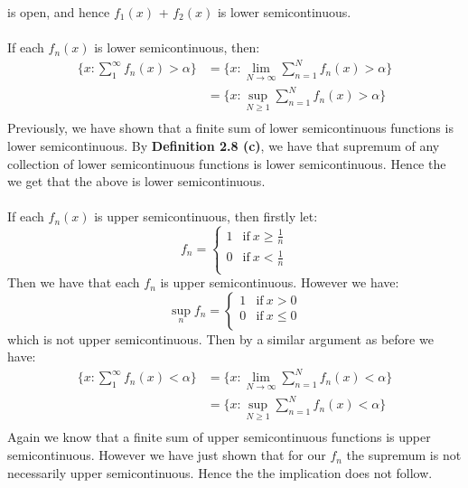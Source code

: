 \documentclass{article}
\begin{document}
is open, and hence $f_1(x)$ + $f_2(x)$ is lower semicontinuous.
\\\\
If each $f_n(x)$ is lower semicontinuous, then:
\begin{equation*}
    \begin{aligned}
        \{ x: \sum_1^\infty f_n(x) > \alpha\} &= \{ x: \lim_{N\to\infty} \sum_{n=1}^N f_n(x) > \alpha \}\\
        &= \{ x: \sup_{N \ge 1} \sum_{n=1}^N f_n(x) > \alpha \} \\
    \end{aligned}
\end{equation*}
Previously, we have shown that a finite sum of lower semicontinuous functions is lower semicontinuous.
By \textbf{Definition 2.8 (c)}, we have that supremum of any collection of lower semicontinuous functions is lower semicontinuous. Hence the we get that the above is lower semicontinuous.
\\\\
If each $f_n(x)$ is upper semicontinuous, then firstly let:
\[ f_n = 
    \begin{cases} 
        1 & \text{if} \ x \ge \frac{1}{n}\\
        0 & \text{if} \ x < \frac{1}{n}\\
    \end{cases}
\]
Then we have that each $f_n$ is upper semicontinuous. However we have:
\[ \sup_{n} f_n = 
    \begin{cases} 
        1 & \text{if} \ x > 0\\
        0 & \text{if} \ x \le 0\\
    \end{cases}
\]
which is not upper semicontinuous.
Then by a similar argument as before we have:
\begin{equation*}
    \begin{aligned}
        \{ x: \sum_1^\infty f_n(x) < \alpha\} &= \{ x: \lim_{N\to\infty} \sum_{n=1}^N f_n(x) < \alpha \}\\
        &= \{ x: \sup_{N \ge 1} \sum_{n=1}^N f_n(x) < \alpha \} \\
    \end{aligned}
\end{equation*}
Again we know that a finite sum of upper semicontinuous functions is upper semicontinuous.
However we have just shown that for our $f_n$ the supremum is not necessarily upper semicontinuous.
Hence the the implication does not follow.
\end{document}
